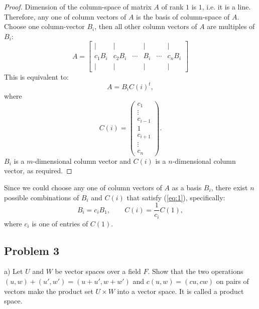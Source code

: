 \documentclass{article}
\theoremstyle{definition}
\begin{document}
\begin{proof}

Dimension of the column-space of matrix $A$ of rank $1$ is $1$, i.e. it is a line. Therefore, any one of column vectors of $A$ is the basis of column-space of $A$. Choose one column-vector $B_i$, then all other column vectors of $A$ are multiples of $B_i$:
\[
    A = 
    \begin{bmatrix}
        | & | && | && | \\
        c_1 B_i & c_2 B_i & \cdots & B_i & \cdots & c_n B_i \\
        | & | && | && |
    \end{bmatrix}
\]
This is equivalent to:
\begin{equation} \label{eq:1}
    A = B_i C(i)^t,
\end{equation}
where
\[
    C(i) =
    \begin{pmatrix}
        c_1 \\
        \vdots \\
        c_{i-1} \\
        1 \\
        c_{i+1} \\
        \vdots \\
        c_n
    \end{pmatrix}.
\]
$B_i$ is a $m$-dimensional column vector and $C(i)$ is a $n$-dimensional column vector, as required.

\end{proof}

Since we could choose any one of column vectors of $A$ as a basis $B_i$, there exist $n$ possible combinations of $B_i$ and $C(i)$ that satisfy (\ref{eq:1}), specifically:
\[ B_i = c_i B_1, \quad \quad C(i) = \frac{1}{c_i} C(1), \]
where $c_i$ is one of entries of $C(1)$.


\subsection*{Problem 3}

\begin{tcolorbox}
a) Let $U$ and $W$ be vector spaces over a field $F$.
Show that the two operations $(u,w)+(u',w') = (u+u', w+w')$ and $c(u,w) = (cu, cw)$ on pairs of vectors make the product set $U \times W$ into a vector space.
It is called a product space.
\end{tcolorbox}
\end{document}
